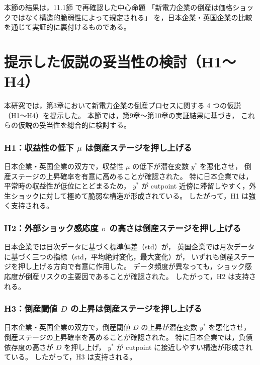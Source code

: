 本節の結果は，11.1節 で再確認した中心命題
「新電力企業の倒産は価格ショックではなく構造的脆弱性によって規定される」
を，日本企業・英国企業の比較を通じて実証的に裏付けるものである。


\section{提示した仮説の妥当性の検討（H1〜H4）}

本研究では，第3章において新電力企業の倒産プロセスに関する
4 つの仮説（H1〜H4）を提示した。
本節では，第9章〜第10章の実証結果に基づき，
これらの仮説の妥当性を総合的に検討する。

\subsubsection*{H1：収益性の低下 $\mu$ は倒産ステージを押し上げる}

日本企業・英国企業の双方で，収益性 $\mu$ の低下が潜在変数 $y^*$ を悪化させ，
倒産ステージの上昇確率を有意に高めることが確認された。
特に日本企業では，平常時の収益性が低位にとどまるため，
$y^*$ が cutpoint 近傍に滞留しやすく，外生ショックに対して極めて脆弱な構造が形成されている。
したがって，H1 は強く支持される。

\subsubsection*{H2：外部ショック感応度 $\sigma$ の高さは倒産ステージを押し上げる}

日本企業では日次データに基づく標準偏差（std）が，
英国企業では月次データに基づく三つの指標（std，平均絶対変化，最大変化）が，
いずれも倒産ステージを押し上げる方向で有意に作用した。
データ頻度が異なっても，ショック感応度が倒産リスクの主要因であることが確認された。
したがって，H2 は支持される。

\subsubsection*{H3：倒産閾値 $D$ の上昇は倒産ステージを押し上げる}

日本企業・英国企業の双方で，倒産閾値 $D$ の上昇が潜在変数 $y^*$ を悪化させ，
倒産ステージの上昇確率を高めることが確認された。
特に日本企業では，負債依存度の高さが $D$ を押し上げ，
$y^*$ が cutpoint に接近しやすい構造が形成されている。
したがって，H3 は支持される。

